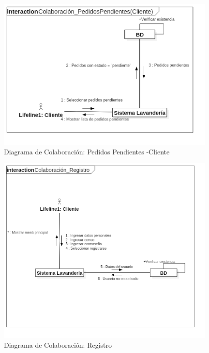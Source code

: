 \begin{figure}[htb]
\begin{center}
\includegraphics[width=11cm]{./imagenes/diagramas/Colaboracion_PedidosPendientes(Cliente).png}
\end{center}
\caption{Diagrama de Colaboración: Pedidos Pendientes -Cliente}
\end{figure}



\begin{figure}[htb]
\begin{center}
\includegraphics[width=11cm]{./imagenes/diagramas/Colaboracion_Registro.png}
\end{center}
\caption{Diagrama de Colaboración: Registro}
\end{figure}

\newpage



